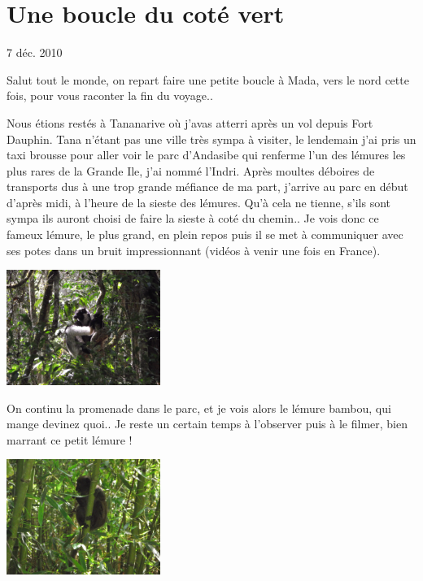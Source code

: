 \section{Une boucle du coté vert}

7 déc. 2010

\begin{multicols}{2}

Salut tout le monde, on repart faire une petite boucle à Mada, vers le nord cette fois, pour vous raconter la fin du voyage..

Nous étions restés à Tananarive où j'avas atterri après un vol depuis Fort Dauphin. Tana n'étant pas une ville très sympa à visiter, le lendemain j'ai pris un taxi brousse pour aller voir le parc d'Andasibe qui renferme l'un des lémures les plus rares de la Grande Ile, j'ai nommé l'Indri. Après moultes déboires de transports dus à une trop grande méfiance de ma part, j'arrive au parc en début d'après midi, à l'heure de la sieste des lémures. Qu'à cela ne tienne, s'ils sont sympa ils auront choisi de faire la sieste à coté du chemin.. Je vois donc ce fameux lémure, le plus grand, en plein repos puis il se met à communiquer avec ses potes dans un bruit impressionnant (vidéos à venir une fois en France).

\smallbreak\smallbreak
\hspace*{-0.65cm}
\includegraphics[width=5cm]{articles/Une-boucle-du-cote-vert/DSCF0386.JPG}
\smallbreak

On continu la promenade dans le parc, et je vois alors le lémure bambou, qui mange devinez quoi.. Je reste un certain temps à l'observer puis à le filmer, bien marrant ce petit lémure !

\smallbreak\smallbreak
\hspace*{-0.65cm}
\includegraphics[width=5cm]{articles/Une-boucle-du-cote-vert/DSCF0395.JPG}
\smallbreak


\end{multicols}

